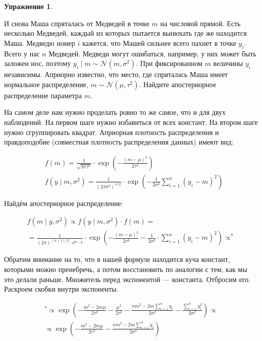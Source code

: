 \documentclass[12pt, a4paper, oneside]{extreport}
\def \mN{\mathcal{N}}
\newcommand{\expp}[1]{ \exp \left( #1 \right)}
\theoremstyle{plain}              %
\theoremstyle{definition}         %
\newtheorem{problem}{\color{myblue} Упражнение}
\begin{document}
\begin{problem}\label{norm_upr}
	
И снова Маша спряталась от Медведей в точке $m$ на числовой прямой. Есть несколько Медведей, каждый из которых пытается вынюхать где же находится Маша. Медведю номер $i$ кажется, что Машей сильнее всего пахнет в точке $y_i$. Всего у нас $n$ Медведей. Медведи могут ошибаться, например, у них может быть заложен нос, поэтому $y_i \mid m \sim \mN( m, \sigma^2)$. При фиксированном $m$ величины $y_i$ независимы. Априорно известно, что место, где спряталась Маша имеет нормальное распределение, $m \sim \mN(\mu, \tau^2)$. Найдите апостериорное распределение параметра $m$.
	
\begin{sol}

На самом деле нам нужно проделать ровно то же самое, что и для двух наблюдений. На первом шаге нужно избавиться от всех констант. На втором шаге нужно сгруппировать квадрат. Априорная плотность распределения и правдоподобие (совместная плотность распределения данных) имеют вид:

\begin{equation*}
\begin{aligned}
&f(m) = \frac{1}{\sqrt{2\pi \tau^2}} \cdot \expp{-\frac{(m - \mu)^2}{2\tau^2}} \\
&f(y \mid m, \sigma^2) = \frac{1}{(2 \pi \sigma^2)^{n/2}} \cdot \expp{-\frac{1}{2\sigma^2} \sum_{i=1}^n (y_i - m)^2}
\end{aligned}
\end{equation*}

Найдём апостериорное распределение:

\begin{multline*}
f(m \mid y, \sigma^2) \propto f(y \mid m, \sigma^2) \cdot f(m) = \\ = \frac{1}{(2\pi)^{(n+1)/2} \cdot \sigma^n \cdot \tau} \cdot \expp{-\frac{(m - \mu)^2}{2 \tau^2} - \frac{1}{2 \sigma^2} \cdot \sum_{i=1}^n (y_i - m)^2} \propto ^{*} 
\end{multline*}

Обратим внимание на то, что в нашей формуле находится куча констант, которыми можно пренебречь, а потом восстановить по аналогии с тем, как мы это делали раньше. Множитель перед экспонентой --- константа. Отбросим его. Раскроем скобки внутри экспоненты.

\begin{multline*}
^{*} \propto \expp{-\frac{m^2 - 2m \mu}{2 \tau^2} - \frac{\mu^2}{2\tau^2} - \frac{n m^2 - 2m \sum_{i=1}^n y_i}{2\sigma^2} - \frac{\sum_{i=1}^{n} y_i^2}{2\sigma^2}} \propto \\ \propto \expp{-\frac{m^2 - 2m \mu}{2 \tau^2} - \frac{n m^2 - 2m \sum_{i=1}^n y_i}{2\sigma^2} }
\end{multline*}


\end{sol}
\end{problem}
\end{document}
